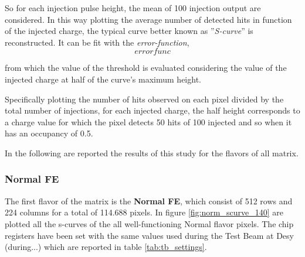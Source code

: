 So for each injection pulse height, the mean of 100 injection output are considered. In this way plotting the average number of detected hits in function of the injected charge, the typical curve better known as ''\textit{S-curve}'' is reconstructed. It can be fit with the \textit{error-function},
\begin{equation}
error func
\end{equation}
 
from which the value of the threshold is evaluated considering the value of the injected charge at half of the curve's maximum height.

Specifically plotting the number of hits observed on each pixel divided by the total number of injections, for each injected charge, the half height corresponds to a charge value for which the pixel detects 50 hits of 100 injected and so when it has an occupancy of 0.5.



\begin{comment}
\begin{figure}
\centering
\texttt{[image: ]}
\caption{An example of the S-Curve and the evluation of the threshold.}
\label{ex_scurve}
\end{figure}
\end{comment}

In the following are reported the results of this study for the flavors of all matrix.

\subsubsection{Normal FE}

The first flavor of the matrix is the \textbf{Normal FE}, which consist of 512 rows and 224 columns for a total of 114.688 pixels. In figure \vref{fig:norm_scurve_140} are plotted all the s-curves of the all well-functioning Normal flavor pixels. The chip registers have been set with the same values used during the Test Beam at Desy (during...) which are reported in table \vref{tab:tb_settings}.


